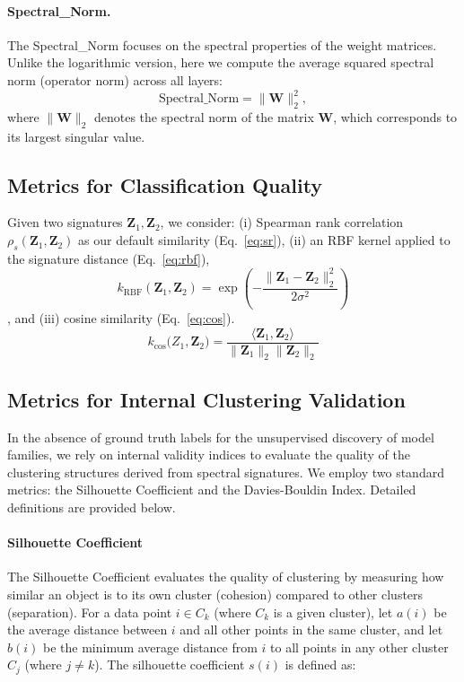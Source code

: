 \paragraph{Spectral\_Norm.}
The Spectral\_Norm focuses on the spectral properties of the weight matrices. Unlike the logarithmic version, here we compute the average squared spectral norm (operator norm) across all layers:
\begin{equation}
    \text{Spectral\_Norm} = \|\mathbf{W}\|_2^2,
\end{equation}
where $\|\mathbf{W}\|_2$ denotes the spectral norm of the matrix $\mathbf{W}$, which corresponds to its largest singular value.

\subsection{Metrics for Classification Quality}\label{app:classification_metric}
Given two signatures $\mathbf{Z}_1,\mathbf{Z}_2$, we consider:
(i) Spearman rank correlation $\rho_s(\mathbf{Z}_1,\mathbf{Z}_2)$ as our default similarity (Eq.~\ref{eq:sr}),
(ii) an RBF kernel applied to the signature distance (Eq.~\ref{eq:rbf}), 
\begin{equation}
k_{\text{RBF}}(\mathbf{Z}_1,\mathbf{Z}_2)=\exp\!\left(-\frac{\|\mathbf{Z}_1-\mathbf{Z}_2\|_2^2}{2\sigma^2}\right)
\label{eq:rbf}
\end{equation}
, and
(iii) cosine similarity (Eq.~\ref{eq:cos}).
\begin{equation}
k_{\cos}\mathbf({Z}_1,\mathbf{Z}_2)=\frac{\langle \mathbf{Z}_1,\mathbf{Z}_2\rangle}{\|\mathbf{Z}_1\|_2\|\mathbf{Z}_2\|_2}
\label{eq:cos}
\end{equation}



\subsection{Metrics for Internal Clustering Validation}
\label{app:eval_metrics_clustering}

In the absence of ground truth labels for the unsupervised discovery of model families, we rely on internal validity indices to evaluate the quality of the clustering structures derived from spectral signatures. We employ two standard metrics: the Silhouette Coefficient and the Davies-Bouldin Index. Detailed definitions are provided below.

\paragraph{Silhouette Coefficient }
The Silhouette Coefficient evaluates the quality of clustering by measuring how similar an object is to its own cluster (cohesion) compared to other clusters (separation). For a data point $i \in C_k$ (where $C_k$ is a given cluster), let $a(i)$ be the average distance between $i$ and all other points in the same cluster, and let $b(i)$ be the minimum average distance from $i$ to all points in any other cluster $C_j$ (where $j \neq k$). The silhouette coefficient $s(i)$ is defined as:

